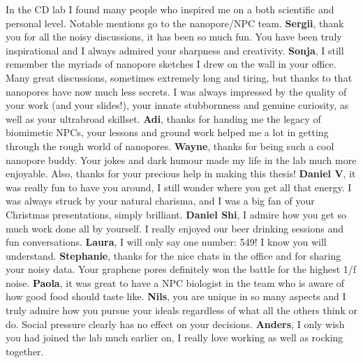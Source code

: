 \noindent In the CD lab I found many people who inspired me on a both scientific and personal level. Notable mentions go to the nanopore/NPC team.
\textbf{Sergii}, thank you for all the noisy discussions, it has been so much fun. You have been truly inspirational and I always admired your sharpness and creativity. \textbf{Sonja}, I still remember the myriads of nanopore sketches I drew on the wall in your office. Many great discussions, sometimes extremely long and tiring, but thanks to that nanopores have now much less secrets. I was always impressed by the quality of your work (and your slides!), your innate stubbornness and genuine curiosity, as well as your ultrabroad skillset. \textbf{Adi}, thanks for handing me the legacy of biomimetic NPCs, your lessons and ground work helped me a lot in getting through the rough world of nanopores. \textbf{Wayne}, thanks for being such a cool nanopore buddy. Your jokes and dark humour made my life in the lab much more enjoyable. Also, thanks for your precious help in making this thesis! \textbf{Daniel V}, it was really fun to have you around, I still wonder where you get all that energy. I was always struck by your natural charisma, and I was a big fan of your Christmas presentations, simply brilliant. \textbf{Daniel Shi}, I admire how you get so much work done all by yourself. I really enjoyed our beer drinking sessions and fun conversations. \textbf{Laura}, I will only say one number: 549! I know you will understand. \textbf{Stephanie}, thanks for the nice chats in the office and for sharing your noisy data. Your graphene pores definitely won the battle for the highest 1/f noise. \textbf{Paola}, it was great to have a NPC biologist in the team who is aware of how good food should taste like. \textbf{Nils}, you are unique in so many aspects and I truly admire how you pursue your ideals regardless of what all the others think or do. Social pressure clearly has no effect on your decisions. \textbf{Anders}, I only wish you had joined the lab much earlier on, I really love working as well as rocking together.\\[0.5pt]

